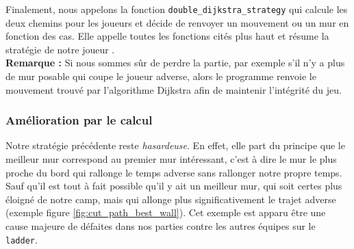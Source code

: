 \documentclass[a4paper]{article}
\begin{document}
Finalement, nous appelons la fonction \texttt{double\_dijkstra\_strategy} qui calcule les deux chemins pour les joueurs et décide de renvoyer un mouvement ou un mur en fonction des cas. Elle appelle toutes les fonctions cités plus haut et résume la stratégie de notre joueur . \\

\textbf{Remarque :} Si nous sommes sûr de perdre la partie, par exemple s'il n'y a plus de mur posable qui coupe le joueur adverse, alors le programme renvoie le mouvement trouvé par l'algorithme Dijkstra afin de maintenir l'intégrité du jeu.

\subsubsection{Amélioration par le calcul}

Notre stratégie précédente reste \textit{hasardeuse}. En effet, elle part du principe que le meilleur mur correspond au premier mur intéressant, c'est à dire le mur le plus proche du bord qui rallonge le temps adverse sans rallonger notre propre temps. Sauf qu'il est tout à fait possible qu'il y ait un meilleur mur, qui soit certes plus éloigné de notre camp, mais qui allonge plus significativement le trajet adverse (exemple figure \ref{fig:cut_path_best_wall}). Cet exemple est apparu être une cause majeure de défaites dans nos parties contre les autres équipes sur le \texttt{ladder}. \\
\end{document}
